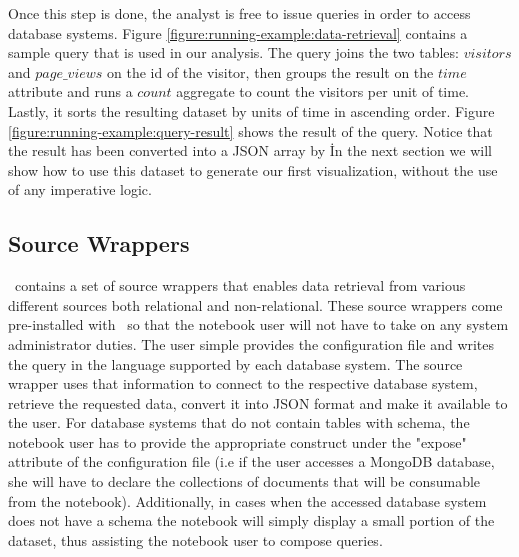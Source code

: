 Once this step is done, the analyst is free to issue queries in order to access database systems. Figure \ref{figure:running-example:data-retrieval} contains a sample query that is used in our analysis. The query joins the two tables: $visitors$ and $page\_views$ on the id of the visitor, then groups the result on the $time$ attribute and runs a $count$ aggregate to count the visitors per unit of time. Lastly, it sorts the resulting dataset by units of time in ascending order. Figure \ref{figure:running-example:query-result} shows the result of the query. Notice that the result has been converted into a JSON array by \projname\. In the next section we will show how to use this dataset to generate our first visualization, without the use of any imperative logic.

\subsection{Source Wrappers}
\label{subsection:source-wrappers}


\projname\ contains a set of source wrappers that enables data retrieval from various different sources both relational and non-relational. These source wrappers come pre-installed with \projname\ so that the notebook user will not have to take on any system administrator duties. The user simple provides the configuration file and writes the query in the language supported by each database system. The source wrapper uses that information to connect to the respective database system, retrieve the requested data, convert it into JSON format and make it available to the user. For database systems that do not contain tables with schema, the notebook user has to provide the appropriate construct under the "expose" attribute of the configuration file (i.e if the user accesses a MongoDB database, she will have to declare the collections of documents that will be consumable from the notebook). Additionally, in cases when the accessed database system does not have a schema the notebook will simply display a small portion of the dataset, thus assisting the notebook user to compose queries.





